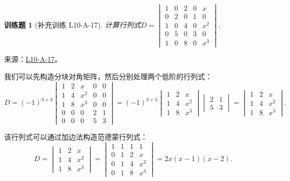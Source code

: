 \documentclass[12pt,fontset=fandol]{ctexart}
\newtheorem{exercise}{训练题}[section]
\begin{document}
\begin{exercise}[补充训练 L10-A-17]\label{prob:L10-A-17}
计算行列式$D=\begin{vmatrix}
                1 & 0 & 2 & 0 & x   \\
                0 & 2 & 0 & 1 & 0   \\
                1 & 0 & 4 & 0 & x^2 \\
                0 & 5 & 0 & 3 & 0   \\
                1 & 0 & 8 & 0 & x^3
            \end{vmatrix}$.
\end{exercise}
\noindent 来源：\href{https://github.com/yhwu-is/Linear-Algebra-Left-Undone/blob/new/%E8%AE%B2%E4%B9%89/%E4%B8%93%E9%A2%98/10%20%E8%A1%8C%E5%88%97%E5%BC%8F.tex}{L10-A-17}。
\begin{solve}
我们可以先构造分块对角矩阵，然后分别处理两个低阶的行列式：
            \[
                D = (-1)^{3+3} \begin{vmatrix}
                    1 & 2 & x   & 0 & 0 \\
                    1 & 4 & x^2 & 0 & 0 \\
                    1 & 8 & x^3 & 0 & 0 \\
                    0 & 0 & 0   & 2 & 1 \\
                    0 & 0 & 0   & 5 & 3
                \end{vmatrix} = (-1)^{3+3} \begin{vmatrix}
                    1 & 2 & x   \\
                    1 & 4 & x^2 \\
                    1 & 8 & x^3
                \end{vmatrix} \begin{vmatrix}
                    2 & 1 \\
                    5 & 3
                \end{vmatrix} = \begin{vmatrix}
                    1 & 2 & x   \\
                    1 & 4 & x^2 \\
                    1 & 8 & x^3
                \end{vmatrix}.
            \]

            该行列式可以通过加边法构造范德蒙行列式：
            \[
                D = \begin{vmatrix}
                    1 & 2 & x   \\
                    1 & 4 & x^2 \\
                    1 & 8 & x^3
                \end{vmatrix} = \begin{vmatrix}
                    1 & 1 & 1 & 1   \\
                    0 & 1 & 2 & x   \\
                    0 & 1 & 4 & x^2 \\
                    0 & 1 & 8 & x^3
                \end{vmatrix} = 2x(x-1)(x-2).
            \]
\end{solve}
\end{document}
